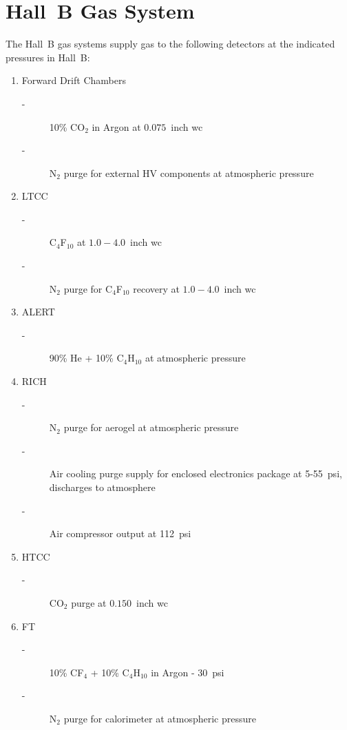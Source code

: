 \section{Hall~B Gas System}

The Hall~B gas systems supply gas to the following detectors at the indicated pressures 
in Hall~B:
\begin{enumerate}
\item Forward Drift Chambers 
\begin{description}
\item[-] 10\% CO$_2$ in Argon at $0.075$~inch wc
\item[-] N$_2$ purge for external HV components at atmospheric pressure
\end{description}
\item LTCC 
\begin{description}
\item[-] C$_4$F$_{10}$ at $1.0 - 4.0$~inch wc
\item[-] N$_2$ purge for C$_4$F$_{10}$ recovery at $1.0-4.0$~inch wc
\end{description}
\item ALERT
  \begin{description}
    \item[-] 90\% He + 10\% C$_4$H$_{10}$ at atmospheric pressure
\end{description}
\item RICH 
\begin{description}
\item[-] N$_2$ purge for aerogel at atmospheric pressure
\item[-] Air cooling purge supply for enclosed electronics package at 5-55~psi, discharges to atmosphere
\item[-] Air compressor output at 112~psi 
\end{description}
\item HTCC 
\begin{description}
\item[-] CO$_2$ purge at $0.150$~inch wc 
\end{description}
\item FT 
\begin{description}
\item[-] 10\% CF$_4$ + 10\% C$_4$H$_{10}$ in Argon - 30~psi
\item[-] N$_2$ purge for calorimeter at atmospheric pressure 
\end{description}
\end{enumerate}

